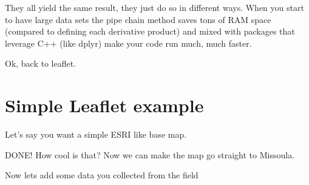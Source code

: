 \documentclass[]{article}
\newenvironment{Shaded}{\begin{snugshade}}{\end{snugshade}}
\newcommand{\DataTypeTok}[1]{\textcolor[rgb]{0.13,0.29,0.53}{#1}}
\newcommand{\DecValTok}[1]{\textcolor[rgb]{0.00,0.00,0.81}{#1}}
\newcommand{\FloatTok}[1]{\textcolor[rgb]{0.00,0.00,0.81}{#1}}
\newcommand{\KeywordTok}[1]{\textcolor[rgb]{0.13,0.29,0.53}{\textbf{#1}}}
\newcommand{\NormalTok}[1]{#1}
\newcommand{\OperatorTok}[1]{\textcolor[rgb]{0.81,0.36,0.00}{\textbf{#1}}}
\newcommand{\StringTok}[1]{\textcolor[rgb]{0.31,0.60,0.02}{#1}}
\begin{document}
They all yield the same result, they just do so in different ways. When
you start to have large data sets the pipe chain method saves tons of
RAM space (compared to defining each derivative product) and mixed with
packages that leverage C++ (like dplyr) make your code run much, much
faster.

Ok, back to leaflet.

\hypertarget{simple-leaflet-example}{%
\section{Simple Leaflet example}\label{simple-leaflet-example}}

Let's say you want a simple ESRI like base map.

\begin{Shaded}
\end{Shaded}

DONE! How cool is that? Now we can make the map go straight to Missoula.

\begin{Shaded}
\end{Shaded}

Now lets add some data you collected from the field
\end{document}
